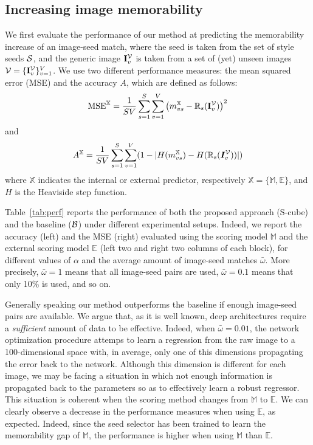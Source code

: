 \documentclass{sig-alternate-05-2015}
\begin{document}
\subsection{Increasing image memorability}
\label{sec:res-memorability}

We first evaluate the performance of our method at predicting the memorability increase of an image-seed match, where the seed is taken from the 
set of style seeds ${\cal S}$, and the generic image $\mathbf{I}_v^{\cal V}$ is taken from a set of (yet) unseen images ${\cal 
V}=\{\mathbf{I}_v^{\cal V}\}_{v=1}^V$. We use two different performance measures: the mean squared error (MSE) and the accuracy $A$, which are 
defined as follows:
\begin{equation}
\textrm{MSE}^\mathbb{X} = \frac{1}{SV} \sum_{s=1}^{S} \sum_{v=1}^{V} \left( m^\mathbb{X}_{vs} - \mathbb{R}_s(\mathbf{I}_v^{\cal V})\right)^2
\end{equation}
and
\begin{equation}
A^\mathbb{X} = \frac{1}{SV} \sum_{s=1}^{S} \sum_{v=1}^{V} ( 1-  | H ( m_{vs}^\mathbb{X})  -  H ( \mathbb{R}_s(\bm{I}_v^{\cal V}) ) |)
\end{equation}
where $\mathbb{X}$ indicates the internal or external predictor, respectively $\mathbb{X} = \{\mathbb{M},\mathbb{E}\}$, and $H$ is the Heaviside step function.



Table~\ref{tab:perf} reports the performance of both the proposed approach (S-cube) and the baseline (${\cal B}$) under different experimental setups. Indeed, we report the accuracy (left) and the MSE (right) evaluated using the scoring model $\mathbb{M}$ and the external scoring model 
$\mathbb{E}$ (left two and right two columns of each block), for different values of $\alpha$ and the average amount of image-seed matches $\bar{\omega}$. More precisely, $\bar{\omega}=1$ means that all image-seed pairs are used, $\bar{\omega}=0.1$ means that only 10\% is used, and 
so on.

Generally speaking our method outperforms the baseline if enough image-seed pairs are available. We argue that, as it is well known, deep architectures require a \textit{sufficient} amount of data to be effective. Indeed, when $\bar{\omega}=0.01$, the network optimization procedure attemps to learn a regression from the raw image to a 100-dimensional space with, in average, only one of this dimensions propagating the 
error back to the network. Although this dimension is different for each image, we may be facing a situation in which not enough information is 
propagated back to the parameters so as to effectively learn a robust regressor. This situation is coherent when the scoring method changes from 
$\mathbb{M}$ to $\mathbb{E}$. We can clearly observe a decrease in the performance measures when using $\mathbb{E}$, as expected. Indeed, since the 
seed selector has been trained to learn the memorability gap of $\mathbb{M}$, the performance is higher when using $\mathbb{M}$ than $\mathbb{E}$.
\end{document}

